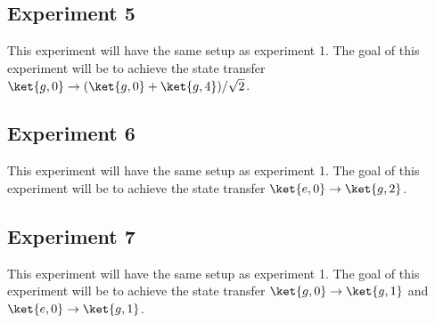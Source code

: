 \documentclass[letterpaper, 12pt]{article}
\begin{document}
\subsection{Experiment 5}
This experiment will have the same setup as experiment 1. The goal of this experiment will be to achieve the state transfer $\ket{g, 0} \rightarrow (\ket{g, 0} + \ket{g, 4}) / \sqrt{2}$.

\subsection{Experiment 6}
This experiment will have the same setup as experiment 1. The goal of this experiment will be to achieve the state transfer $\ket{e, 0} \rightarrow \ket{g, 2}$.

\subsection{Experiment 7}
This experiment will have the same setup as experiment 1. The goal of this experiment will be to achieve the state transfer $\ket{g, 0} \rightarrow \ket{g, 1}$ and $\ket{e, 0} \rightarrow \ket{g, 1}$.



\end{document}
